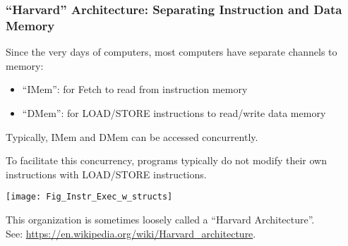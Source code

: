 
\begin{frame}[fragile]
\frametitle{``Harvard'' Architecture: Separating Instruction and Data Memory}

\footnotesize

\begin{minipage}{0.35\textwidth}

 Since the very days of computers, most computers have separate channels to memory:

 \begin{itemize}

  \item ``IMem'': for Fetch to read from instruction memory

  \item ``DMem'': for LOAD/STORE instructions to read/write data memory

 \end{itemize}

 Typically, IMem and DMem can be accessed concurrently.

To facilitate this concurrency, programs typically do not modify their
 own instructions with LOAD/STORE instructions.

\end{minipage}
\hm
\begin{minipage}{0.6\textwidth}

 \begin{center}
  \texttt{[image: Fig\_Instr\_Exec\_w\_structs]}
 \end{center}

\end{minipage}

\vfill

This organization is sometimes loosely called a ``Harvard Architecture''. \\
See: \hm \url{https://en.wikipedia.org/wiki/Harvard_architecture}.

\end{frame}






